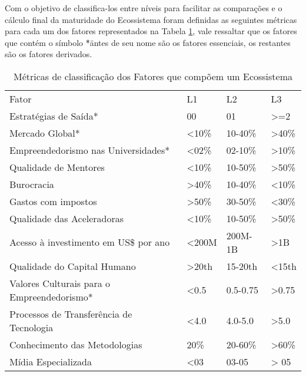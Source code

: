 Com o objetivo de classifica-los entre níveis para facilitar as comparações e o cálculo final da maturidade do Ecossistema foram definidas as seguintes métricas para cada um dos fatores representados na Tabela \ref{tabela:metricas_de_classificacao_dos_fatores}, vale ressaltar que os fatores que contém o símbolo \"*\" antes de seu nome são os fatores essenciais, os restantes são os fatores derivados.

\begin{table}[!htb]
\centering
\caption{Métricas de classificação dos Fatores que compõem um Ecossistema}
\label{tabela:metricas_de_classificacao_dos_fatores}
\begin{tabular}{llll}
Fator                                                      &     L1     &     L2     &     L3   \\
Estratégias de Saída*                                      &     00     &     01     &    >=2   \\
Mercado Global*                                            &    <10\%   &   10-40\%  &    >40\% \\
Empreendedorismo nas Universidades*                        &    <02\%   &   02-10\%  &    >10\% \\
Qualidade de Mentores                                      &    <10\%   &   10-50\%  &    >50\% \\
Burocracia                                                 &    >40\%   &   10-40\%  &    <10\% \\
Gastos com impostos                                        &    >50\%   &   30-50\%  &    <30\% \\
Qualidade das Aceleradoras                                 &    <10\%   &   10-50\%  &    >50\% \\
Acesso à investimento em US\$ por ano                      &    <200M   &   200M-1B  &    >1B   \\
Qualidade do Capital Humano                                &    >20th   &   15-20th  &    <15th \\
Valores Culturais para o Empreendedorismo*                 &    <0.5    &   0.5-0.75 &    >0.75 \\
Processos de Transferência de Tecnologia                   &    <4.0    &   4.0-5.0  &    >5.0  \\
Conhecimento das Metodologias                              &    20\%    &   20-60\%  &    >60\% \\
Mídia Especializada                                        &    <03     &   03-05    &    > 05  \\

\end{tabular}
\end{table}
